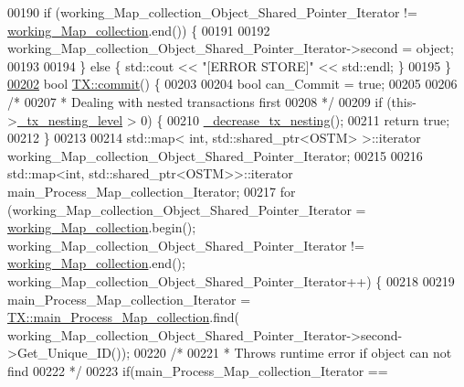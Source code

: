 \begin{DoxyCode}
00190     \textcolor{keywordflow}{if} (working\_Map\_collection\_Object\_Shared\_Pointer\_Iterator != 
      \hyperlink{class_t_x_a81aafda16e2f20e36ec6c68e584668ff_a81aafda16e2f20e36ec6c68e584668ff}{working\_Map\_collection}.end()) \{
00191 
00192         working\_Map\_collection\_Object\_Shared\_Pointer\_Iterator->second = object;
00193 
00194     \} \textcolor{keywordflow}{else} \{ std::cout << \textcolor{stringliteral}{"[ERROR STORE]"} << std::endl; \}
00195 \}
\hypertarget{_t_x_8cpp_source.tex_l00202}{}\hyperlink{class_t_x_a9dde5d356b35e557448e58d260087356_a9dde5d356b35e557448e58d260087356}{00202} \textcolor{keywordtype}{bool} \hyperlink{class_t_x_a9dde5d356b35e557448e58d260087356_a9dde5d356b35e557448e58d260087356}{TX::commit}() \{
00203 
00204     \textcolor{keywordtype}{bool} can\_Commit = \textcolor{keyword}{true};
00205  
00206     \textcolor{comment}{/*}
00207 \textcolor{comment}{     * Dealing with nested transactions first }
00208 \textcolor{comment}{     */}
00209     \textcolor{keywordflow}{if} (this->\hyperlink{class_t_x_ae8f413fd7f4fea322e7ad3c668f9898e_ae8f413fd7f4fea322e7ad3c668f9898e}{\_tx\_nesting\_level} > 0) \{
00210         \hyperlink{class_t_x_aa3ac499f576326588628ade96b27b4b1_aa3ac499f576326588628ade96b27b4b1}{\_decrease\_tx\_nesting}();
00211         \textcolor{keywordflow}{return} \textcolor{keyword}{true};
00212     \} 
00213     
00214     std::map< int, std::shared\_ptr<OSTM> >::iterator working\_Map\_collection\_Object\_Shared\_Pointer\_Iterator;
00215 
00216     std::map<int, std::shared\_ptr<OSTM>>::iterator main\_Process\_Map\_collection\_Iterator;
00217     \textcolor{keywordflow}{for} (working\_Map\_collection\_Object\_Shared\_Pointer\_Iterator = 
      \hyperlink{class_t_x_a81aafda16e2f20e36ec6c68e584668ff_a81aafda16e2f20e36ec6c68e584668ff}{working\_Map\_collection}.begin(); working\_Map\_collection\_Object\_Shared\_Pointer\_Iterator
       != \hyperlink{class_t_x_a81aafda16e2f20e36ec6c68e584668ff_a81aafda16e2f20e36ec6c68e584668ff}{working\_Map\_collection}.end(); 
      working\_Map\_collection\_Object\_Shared\_Pointer\_Iterator++) \{
00218 
00219             main\_Process\_Map\_collection\_Iterator = 
      \hyperlink{class_t_x_a1a45d726894190695314464d7cd97c29_a1a45d726894190695314464d7cd97c29}{TX::main\_Process\_Map\_collection}.find(
      working\_Map\_collection\_Object\_Shared\_Pointer\_Iterator->second->Get\_Unique\_ID());
00220             \textcolor{comment}{/*}
00221 \textcolor{comment}{             * Throws runtime error if object can not find}
00222 \textcolor{comment}{             */}
00223             \textcolor{keywordflow}{if}(main\_Process\_Map\_collection\_Iterator == 

\end{DoxyCode}
